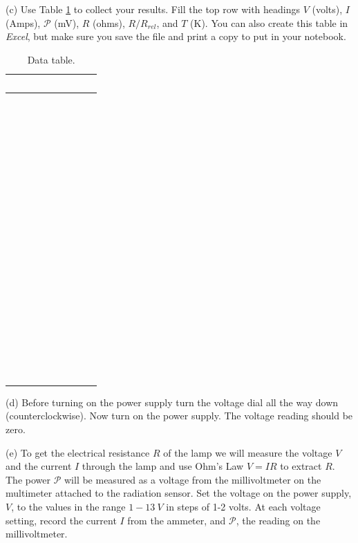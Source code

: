 (c) Use Table \ref{dataTable} to collect your results. Fill the top row with headings 
$V$ (volts), $I$ (Amps), $\mathscr{P}$ (mV), $R$ (ohms), 
$R/R_{rel}$, and $T$ (K).
You can also create this table in {\it Excel}, but make sure you save the file and print a copy
to put in your notebook. 

\begin{table}[hbt]
\begin{center}
\begin{tabular}{|p{0.8in}|p{0.8in}|p{0.8in}|p{0.8in}|p{0.8in}|p{0.8in}|} \hline
\ & \ & \ & \ & \ & \ \\ \hline
\ & \ & \ & \ & \ & \ \\
\ & \ & \ & \ & \ & \ \\
\ & \ & \ & \ & \ & \ \\
\ & \ & \ & \ & \ & \ \\
\ & \ & \ & \ & \ & \ \\
\ & \ & \ & \ & \ & \ \\
\ & \ & \ & \ & \ & \ \\
\ & \ & \ & \ & \ & \ \\
\ & \ & \ & \ & \ & \ \\
\ & \ & \ & \ & \ & \ \\
\ & \ & \ & \ & \ & \ \\
\ & \ & \ & \ & \ & \ \\
\ & \ & \ & \ & \ & \ \\
\ & \ & \ & \ & \ & \ \\
\ & \ & \ & \ & \ & \ \\
\ & \ & \ & \ & \ & \ \\
\ & \ & \ & \ & \ & \ \\ \hline
\end{tabular}
\caption{Data table.}\label{dataTable}
\end{center}
\end{table}

(d) Before turning on the power supply turn the voltage dial all the way down (counterclockwise).
Now turn on the power supply. The voltage reading should be zero.

(e) To get the electrical resistance $R$ of the lamp we will measure the voltage $V$ and the current
$I$ through the lamp and use Ohm's Law $V=IR$ to extract $R$. 
The power $\mathscr{P}$ will be measured as a voltage from the millivoltmeter on the multimeter 
attached to the
radiation sensor.
Set the voltage on the power supply, $V$, to the values in the range $1-13~V$ in steps of 1-2 volts.
At each voltage setting, record the current $I$ from the ammeter, and $\mathscr{P}$, the
reading on the millivoltmeter.

